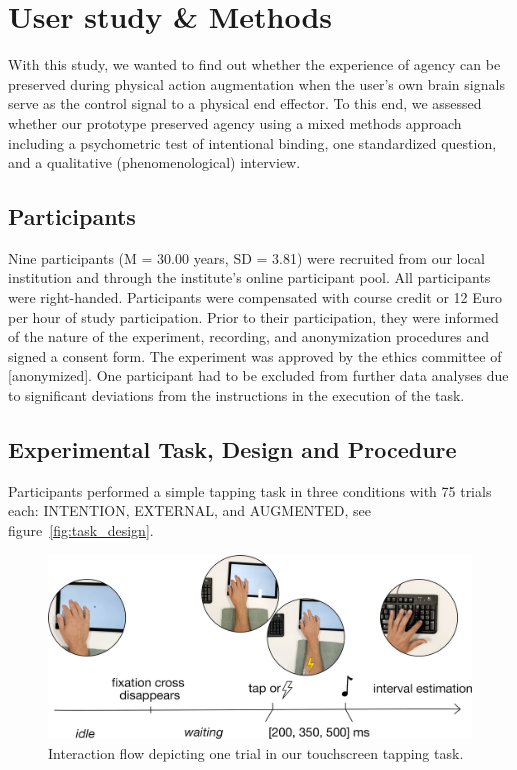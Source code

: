 
\section{User study \& Methods}
With this study, we wanted to find out whether the experience of agency can be preserved during physical action augmentation when the user's own brain signals serve as the control signal to a physical end effector. To this end, we assessed whether our prototype preserved agency using a mixed methods approach including a psychometric test of intentional binding, one standardized question, and a qualitative (phenomenological) interview.

\subsection{Participants}
Nine participants (M = 30.00 years, SD = 3.81) were recruited from our local institution and through the institute's online participant pool. All participants were right-handed. Participants were compensated with course credit or 12 Euro per hour of study participation. Prior to their participation, they were informed of the nature of the experiment, recording, and anonymization procedures and signed a consent form. The experiment was approved by the ethics committee of [anonymized]. One participant had to be excluded from further data analyses due to significant deviations from the instructions in the execution of the task.

\subsection{Experimental Task, Design and Procedure}
Participants performed a simple tapping task in three conditions with 75 trials each: INTENTION, EXTERNAL, and AUGMENTED, see figure~\ref{fig:task_design}.

\begin{figure}
    \centering
    \includegraphics[width=\columnwidth]{figures/task_new.pdf}
    \caption{Interaction flow depicting one trial in our touchscreen tapping task.}
    \label{fig:progression}
\end{figure}

